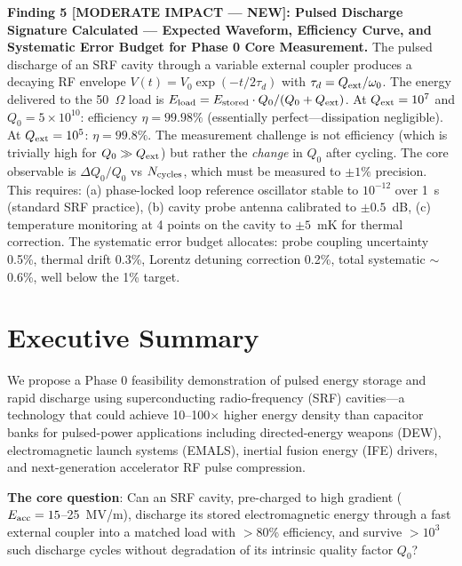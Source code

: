 \documentclass[11pt]{article}
\newcommand{\ee}[1]{\times 10^{#1}}
\newcommand{\Qext}{Q_{\rm ext}}
\newcommand{\Qzero}{Q_0}
\begin{document}
\begin{tcolorbox}[colback=blue!5!white, colframe=blue!60!black,
  title=\textbf{W4i17 P7 --- Top 5 Findings (Ranked by Impact)}]
\textbf{Finding 5 [MODERATE IMPACT --- NEW]: Pulsed Discharge
Signature Calculated --- Expected Waveform, Efficiency Curve, and
Systematic Error Budget for Phase 0 Core Measurement.}
The pulsed discharge of an SRF cavity through a variable external
coupler produces a decaying RF envelope $V(t) = V_0 \exp(-t/2\tau_d)$
with $\tau_d = \Qext / \omega_0$. The energy delivered to the
50~$\Omega$ load is $E_{\rm load} = E_{\rm stored} \cdot
\Qzero/(\Qzero + \Qext)$. At $\Qext = 10^7$ and $\Qzero = 5\ee{10}$:
efficiency $\eta = 99.98\%$ (essentially perfect---dissipation
negligible). At $\Qext = 10^5$: $\eta = 99.8\%$. The measurement
challenge is not efficiency (which is trivially high for $\Qzero \gg
\Qext$) but rather the \emph{change} in $\Qzero$ after cycling.
The core observable is $\Delta\Qzero / \Qzero$ vs $N_{\rm cycles}$,
which must be measured to $\pm 1\%$ precision. This requires:
(a) phase-locked loop reference oscillator stable to $10^{-12}$
over 1~s (standard SRF practice), (b) cavity probe antenna calibrated
to $\pm 0.5$~dB, (c) temperature monitoring at 4 points on the
cavity to $\pm 5$~mK for thermal correction. The systematic error
budget allocates: probe coupling uncertainty 0.5\%, thermal drift
0.3\%, Lorentz detuning correction 0.2\%, total systematic
$\sim$0.6\%, well below the 1\% target.

\end{tcolorbox}

\newpage
\tableofcontents
\newpage

\section{Executive Summary}
\label{sec:executive}

We propose a Phase 0 feasibility demonstration of pulsed energy
storage and rapid discharge using superconducting radio-frequency
(SRF) cavities---a technology that could achieve 10--100$\times$
higher energy density than capacitor banks for pulsed-power
applications including directed-energy weapons (DEW), electromagnetic
launch systems (EMALS), inertial fusion energy (IFE) drivers, and
next-generation accelerator RF pulse compression.

\textbf{The core question}: Can an SRF cavity, pre-charged to high
gradient ($E_{\rm acc} = 15$--25~MV/m), discharge its stored
electromagnetic energy through a fast external coupler into a matched
load with $>$80\% efficiency, and survive $>10^3$ such discharge
cycles without degradation of its intrinsic quality factor $\Qzero$?
\end{document}
